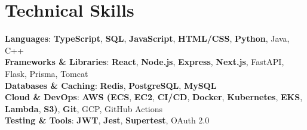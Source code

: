 \documentclass[letterpaper,11pt]{article}
\begin{document}
\section*{Technical Skills}
\begingroup
\small
\textbf{Languages}: \textbf{TypeScript}, \textbf{SQL}, \textbf{JavaScript}, \textbf{HTML/CSS}, \textbf{Python}, Java, C++ \\
\textbf{Frameworks \& Libraries}: \textbf{React}, \textbf{Node.js}, \textbf{Express}, \textbf{Next.js}, FastAPI, Flask, Prisma, Tomcat \\
\textbf{Databases \& Caching}: \textbf{Redis}, \textbf{PostgreSQL}, \textbf{MySQL} \\
\textbf{Cloud \& DevOps}: \textbf{AWS (ECS}, \textbf{EC2}, \textbf{CI/CD}, \textbf{Docker}, \textbf{Kubernetes}, \textbf{EKS}, \textbf{Lambda}, \textbf{S3)}, \textbf{Git}, GCP, GitHub Actions \\
\textbf{Testing \& Tools}: \textbf{JWT}, \textbf{Jest}, \textbf{Supertest}, OAuth 2.0 \\
\endgroup
\end{document}
